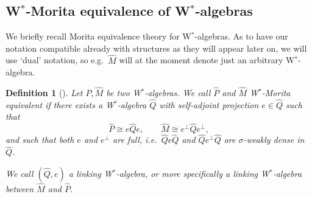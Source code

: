 \documentclass[reqno]{amsart}
\numberwithin{equation}{section}
\newtheorem{Def}[Theorem]{Definition}
\begin{document}
\subsection{W\texorpdfstring{$^*$}{*}-Morita equivalence of W\texorpdfstring{$^*$}{*}-algebras}

We briefly recall Morita equivalence theory for W$^*$-algebras. As to have our notation compatible already with structures as they will appear later on, we will use `dual' notation, so e.g.\ $\hat{M}$ will at the moment denote  just an arbitrary W$^*$-algebra.

\begin{Def}[\cite{Rie74}]
Let $\hat{P},\hat{M}$ be two W$^*$-algebras. We call $\hat{P}$ and $\hat{M}$ \emph{W$^*$-Morita equivalent} if there exists a W$^*$-algebra $\hat{Q}$ with self-adjoint projection $e\in\hat{Q}$ such that 
\[
\hat{P} \cong e\hat{Q}e,\qquad \hat{M} \cong e^{\perp}\hat{Q}e^{\perp},
\]
and such that both $e$ and $e^{\perp}$ are \emph{full}, i.e.\ $\hat{Q}e\hat{Q}$ and $\hat{Q}e^{\perp}\hat{Q}$ are $\sigma$-weakly dense in $\hat{Q}$. 

We  call $(\hat{Q},e)$ a \emph{linking W$^*$-algebra}, or more specifically a linking W$^*$-algebra between $\hat{M}$ and $\hat{P}$. 
\end{Def}
\end{document}
